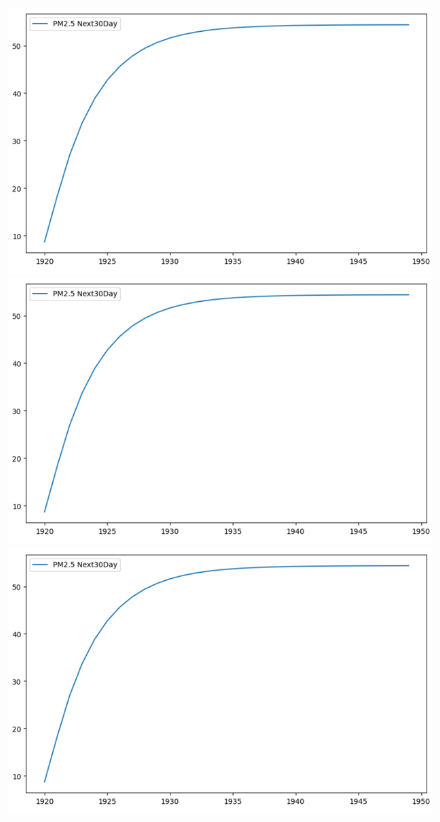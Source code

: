 \begin{figure}[H]
\begin{minipage}{0.15\textwidth}
    \end{minipage}
    \hfill

    \begin{minipage}{0.15\textwidth}
    \centering
    \includegraphics[width=1\textwidth]{img/final/VAR/VAR_7_3_HN_30D.png}
    \end{minipage}
    \hfill
    \begin{minipage}{0.15\textwidth}
    \centering
    \includegraphics[width=1\textwidth]{img/final/VAR/VAR_7_3_HN_30D.png}
    \end{minipage}
    \hfill
    \begin{minipage}{0.15\textwidth}
    \centering
    \includegraphics[width=1\textwidth]{img/final/VAR/VAR_7_3_HN_30D.png}
    \end{minipage}
    \hfill


\end{figure}
